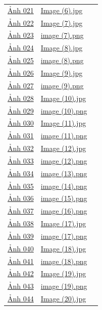 \begin{longtable}{p{}p{}p{}}
\hyperref[src:021]{Ảnh 021} & \url{Image (6).jpg} & \pageref{src:021}\\
\hyperref[src:022]{Ảnh 022} & \url{Image (7).jpg} & \pageref{src:022}\\
\hyperref[src:023]{Ảnh 023} & \url{image (7).png} & \pageref{src:023}\\
\hyperref[src:024]{Ảnh 024} & \url{Image (8).jpg} & \pageref{src:024}\\
\hyperref[src:025]{Ảnh 025} & \url{image (8).png} & \pageref{src:025}\\
\hyperref[src:026]{Ảnh 026} & \url{Image (9).jpg} & \pageref{src:026}\\
\hyperref[src:027]{Ảnh 027} & \url{image (9).png} & \pageref{src:027}\\
\hyperref[src:028]{Ảnh 028} & \url{Image (10).jpg} & \pageref{src:028}\\
\hyperref[src:029]{Ảnh 029} & \url{image (10).png} & \pageref{src:029}\\
\hyperref[src:030]{Ảnh 030} & \url{Image (11).jpg} & \pageref{src:030}\\
\hyperref[src:031]{Ảnh 031} & \url{image (11).png} & \pageref{src:031}\\
\hyperref[src:032]{Ảnh 032} & \url{Image (12).jpg} & \pageref{src:032}\\
\hyperref[src:033]{Ảnh 033} & \url{image (12).png} & \pageref{src:033}\\
\hyperref[src:034]{Ảnh 034} & \url{image (13).png} & \pageref{src:034}\\
\hyperref[src:035]{Ảnh 035} & \url{image (14).png} & \pageref{src:035}\\
\hyperref[src:036]{Ảnh 036} & \url{image (15).png} & \pageref{src:036}\\
\hyperref[src:037]{Ảnh 037} & \url{image (16).png} & \pageref{src:037}\\
\hyperref[src:038]{Ảnh 038} & \url{Image (17).jpg} & \pageref{src:038}\\
\hyperref[src:039]{Ảnh 039} & \url{image (17).png} & \pageref{src:039}\\
\hyperref[src:040]{Ảnh 040} & \url{Image (18).jpg} & \pageref{src:040}\\
\hyperref[src:041]{Ảnh 041} & \url{image (18).png} & \pageref{src:041}\\
\hyperref[src:042]{Ảnh 042} & \url{Image (19).jpg} & \pageref{src:042}\\
\hyperref[src:043]{Ảnh 043} & \url{image (19).png} & \pageref{src:043}\\
\hyperref[src:044]{Ảnh 044} & \url{Image (20).jpg} & \pageref{src:044}\\

\end{longtable}
